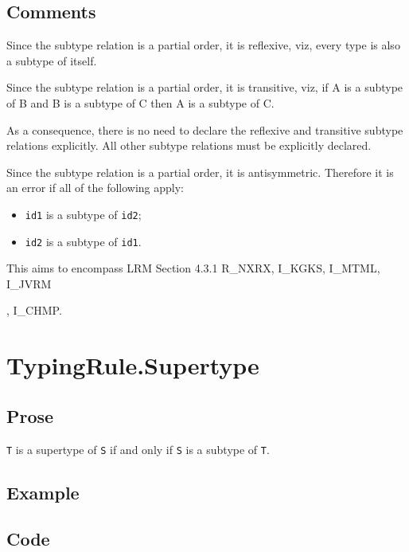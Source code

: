 \documentclass{book}
\begin{document}
  \subsection{Comments}
  Since the subtype relation is a partial order, it is reflexive, viz, 
  every type is also a subtype of itself. 

  Since the subtype relation is a partial order, it is transitive, viz, if A is
  a subtype of B and B is a subtype of C then A is a subtype of C.
 
  As a consequence, there is no need to declare the reflexive and transitive
  subtype relations explicitly. All other subtype relations must be explicitly
  declared.
 
  Since the subtype relation is a partial order, it is antisymmetric. Therefore
  it is an error if all of the following apply:
  \begin{itemize}
  \item \texttt{id1} is a subtype of \texttt{id2};
  \item \texttt{id2} is a subtype of \texttt{id1}.
  \end{itemize}

  This aims to encompass LRM Section 4.3.1 R\_NXRX, I\_KGKS, I\_MTML, I\_JVRM 
\begin{comment}  
ROMAN: I don't see how, in the code.
\end{comment}
, I\_CHMP.

\section{TypingRule.Supertype}

  \subsection{Prose}
  \texttt{T} is a supertype of \texttt{S} if and only if \texttt{S} is a subtype of \texttt{T}.
  
\begin{comment}
ROMAN: This rule doesn't exist in the code. Also, it is redundant, since it just applies to the same arguments in reverse order. I recommend removing this section.
\end{comment}

  \subsection{Example}

  \subsection{Code}
\end{document}
